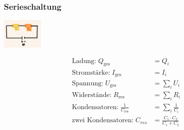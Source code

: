     \subsubsection{Serieschaltung}
        \vspace{-1mm}
        \begin{minipage}{0.39\linewidth}
            \begin{footnotesize}
                \begin{center}
                    \vspace{2mm}
                    \includegraphics[width = 20mm]{src/images/serieschaltung.png}
                \end{center}
            \end{footnotesize}
        \end{minipage}
        \begin{minipage}{0.6\linewidth}
            \begin{scriptsize}
                \begin{center}
                    \begin{align*}
                        \text{Ladung:} \; Q_{\text{ges}} &= Q_i\\
                        \text{Stromstärke:} \; I_{\text{ges}} &= I_i\\
                        \text{Spannung:} \; U_{\text{ges}} &= \sum\limits_i U_i\\
                        \text{Widerstände:} \; R_{\text{res}} &= \sum\limits_i R_i\\
                        \text{Kondensatoren:} \; \frac{1}{C_{\text{res}}} &= \sum\limits_i \frac{1}{C_i}\\
                        \text{zwei Kondensatoren:} \; C_{res} &= \frac{C_1 \cdot C_2}{C_1 + C_2}
                    \end{align*}
                \end{center}
            \end{scriptsize}
        \end{minipage}
        \vspace{1mm}


